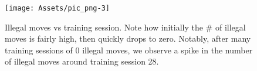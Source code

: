 \begin{figure}[b]
	\centering
	\texttt{[image: Assets/pic\_png-3]}
	\caption{Illegal moves vs training session.  Note how initially the \# of illegal moves is fairly high, then quickly drops to zero.
    Notably, after many training sessions of 0 illegal moves, we observe a spike in the number of illegal moves around training session 28.}
	\label{fig:IllegalMovesTraining}
\end{figure}
